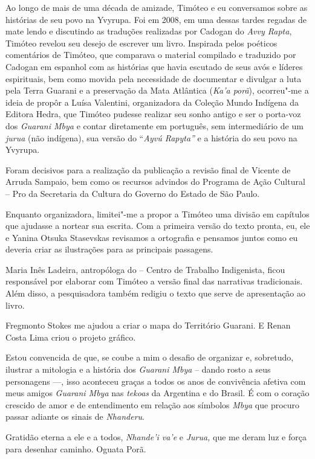 Ao longo de mais de uma década de amizade, Timóteo e eu conversamos sobre as histórias de seu povo na Yvyrupa. Foi em 2008, em uma dessas tardes regadas de mate lendo e discutindo as traduções realizadas por Cadogan do \emph{Avvy Rapta}, Timóteo revelou seu desejo de escrever um livro. Inspirada pelos poéticos comentários de Timóteo, que comparava o material compilado e traduzido por Cadogan em espanhol
com as histórias que havia escutado de seus avós e líderes espirituais,
bem como movida pela necessidade de documentar e divulgar a luta pela
Terra Guarani e a preservação da Mata Atlântica (\emph{Ka'a porã}),
ocorreu"-me a ideia de propôr a Luísa Valentini, organizadora da Coleção Mundo Indígena da Editora Hedra, que Timóteo pudesse realizar seu sonho antigo e ser o
porta-voz dos \emph{Guarani Mbya} e contar diretamente em português, sem
intermediário de um \emph{jurua} (não indígena), sua versão do
``\emph{Ayvú Rapyta''} e a história do seu povo na Yvyrupa.

Foram decisivos para a realização da publicação a revisão final de Vicente de Arruda Sampaio, bem como os recursos advindos do Programa de Ação Cultural -- Pro da Secretaria da Cultura do Governo do Estado de São Paulo.

Enquanto organizadora, limitei"-me a propor a Timóteo uma divisão em
capítulos que ajudasse a nortear sua escrita. Com a primeira versão do
texto pronta, eu, ele e Yanina Otsuka Stasevskas revisamos a ortografia
e pensamos juntos como eu deveria criar as ilustrações para as
principais passagens.

Maria Inês Ladeira, antropóloga do  -- Centro de Trabalho
Indigenista, ficou responsável por elaborar com Timóteo a versão final
das narrativas tradicionais. Além disso, a pesquisadora também redigiu o texto que serve de apresentação ao livro.

Fregmonto Stokes me ajudou a criar o mapa do Território Guarani. E Renan Costa Lima criou
o projeto gráfico.

Estou convencida de que, se coube a mim o desafio de organizar e,
sobretudo, ilustrar a mitologia e a história dos \emph{Guarani Mbya} --
dando rosto a seus personagens \mbox{---,} isso aconteceu graças a todos os anos
de convivência afetiva com meus amigos \emph{Guarani Mbya} nas
\emph{tekoas} da Argentina e do Brasil. É com o coração crescido de amor
e de entendimento em relação aos símbolos \emph{Mbya} que procuro passar
adiante os sinais de \emph{Nhanderu}.

Gratidão eterna a ele e a todos, \emph{Nhande'i
va'e} e \emph{Jurua,} que me deram luz e força para desenhar caminho.
Oguata Porã.

